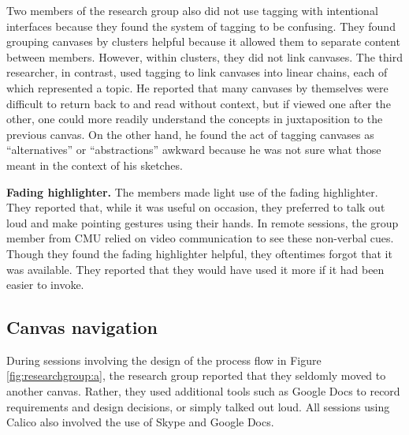 \documentclass[12pt,fleqn]{ucithesis}
\begin{document}
Two members of the research group also did not use tagging with intentional interfaces because they found the system of tagging to be confusing. They found grouping canvases by clusters helpful because it allowed them to separate content between members. However, within clusters, they did not link canvases. The third researcher, in contrast, used tagging to link canvases into linear chains, each of which represented a topic. He reported that many canvases by themselves were difficult to return back to and read without context, but if viewed one after the other, one could more readily understand the concepts in juxtaposition to the previous canvas. On the other hand, he found the act of tagging canvases as ``alternatives'' or ``abstractions'' awkward because he was not sure what those meant in the context of his sketches.


\textbf{Fading highlighter.} The members made light use of the fading highlighter. They reported that, while it was useful on occasion, they preferred to talk out loud and make pointing gestures using their hands. In remote sessions, the group member from CMU relied on video communication to see these non-verbal cues. Though they found the fading highlighter helpful, they oftentimes forgot that it was available. They reported that they would have used it more if it had been easier to invoke.

\subsection{Canvas navigation}

During sessions involving the design of the process flow in Figure \ref{fig:researchgroup:a}, the research group reported that they seldomly moved to another canvas. Rather, they used additional tools such as Google Docs to record requirements and design decisions, or simply talked out loud. All sessions using Calico also involved the use of Skype and Google Docs.
\end{document}
